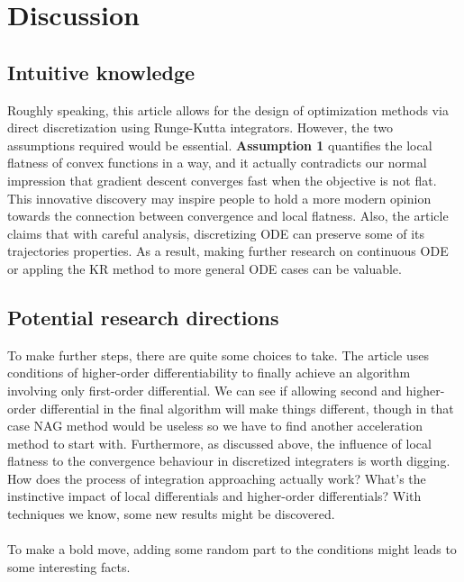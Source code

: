 \section{Discussion}

\subsection{Intuitive knowledge}

Roughly speaking, this article allows for the design of optimization
methods via direct discretization using Runge-Kutta integrators. However, the two
assumptions required would be essential. \textbf{Assumption 1} quantifies the local flatness
of convex functions in a way, and it actually contradicts our normal impression that
gradient descent converges fast when the objective is not flat. This innovative discovery
may inspire people to hold a more modern opinion towards the connection between
convergence and local flatness. Also, the article claims that with careful
analysis, discretizing ODE can preserve some of its trajectories properties.
As a result, making further research on continuous ODE or appling the KR method to
more general ODE cases can be valuable.

\subsection{Potential research directions}

To make further steps, there are quite some choices to take. The article uses conditions
of higher-order differentiability to finally achieve an algorithm involving only
first-order differential. We can see if allowing second and higher-order differential in
the final algorithm will make things different, though in that case NAG method
would be useless so we have to find another acceleration method to start with. Furthermore,
as discussed above, the influence of local flatness to the convergence behaviour in
discretized integraters is worth digging. How does the process of integration approaching
actually work? What's the instinctive impact of local differentials and higher-order
differentials? With techniques we know, some new results might be discovered.\\\\
To make a bold move, adding some random part to the conditions might leads to some
interesting facts.\\\\
